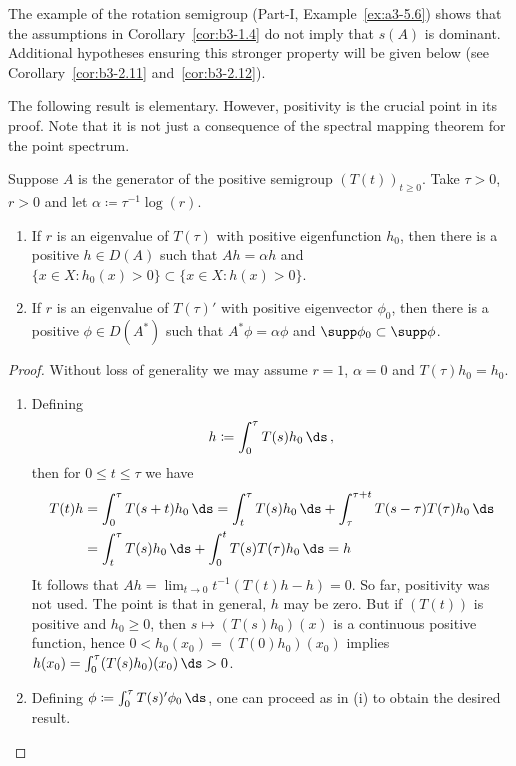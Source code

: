 The example of the rotation semigroup (Part-I, Example~\ref{ex:a3-5.6}) shows that the assumptions in Corollary~\ref{cor:b3-1.4} do not imply that $s(A)$ is dominant.
Additional hypotheses ensuring this stronger property will be given below (see Corollary~\ref{cor:b3-2.11} and~\ref{cor:b3-2.12}).

The following result is elementary. 
However, positivity is the crucial point in its proof. 	
Note that it is not just a consequence of the spectral mapping theorem for the point spectrum.
\begin{proposition}\label{prop:b3-1.5}
Suppose $A$ is the generator of the positive semigroup $(T(t))_{t \geq 0}$.
Take $\tau > 0$, $r > 0$ and let $\alpha \coloneqq \tau^{-1}\log(r)$.
\begin{enumerate}[\upshape (i)]
\item 
If\/ $r$ is an eigenvalue of\/ $T(\tau)$ with positive eigenfunction
$h_{0}$, then there is a positive $h \in D(A)$ such that $Ah = \alpha h$ and $\{x \in X \colon h_{0}(x) > 0\} \subset \{x \in X \colon h(x) > 0\}$.
		
\item 
If\/ $r$ is an eigenvalue of\/ $T(\tau)'$ with positive eigenvector $\phi_{0}$, then there is a positive $\phi \in D(A^*)$ such that $A^*\phi = \alpha\phi$ and $\supp\phi_{0} \subset \supp\phi$.
	\end{enumerate}
\end{proposition}
\begin{proof}
	Without loss of generality we may assume $r = 1$, \ie $\alpha = 0$ and $T(\tau)h_{0} = h_{0}$.
	\begin{enumerate}[\upshape (i), wide, labelindent=.25em]
    \item 
	Defining
	\begin{equation}\label{eq:b3-1.14}
		h \coloneqq \int_{0}^{\tau} T(s)h_{0} \, \ds \,,
	\end{equation}
	then for $0 \leq t \leq \tau$ we have
	\begin{align*}
		T(t)h &= \int_{0}^{\tau} T(s+t)h_{0} \, \ds  = \int_{t}^{\tau} T(s)h_{0} \, \ds  + \int_{\tau}^{\tau+t} T(s-\tau)T(\tau)h_{0} \, \ds  \\
		&= \int_{t}^{\tau} T(s)h_{0} \, \ds  + \int_{0}^{t} T(s)T(\tau)h_{0} \, \ds  = h
	\end{align*}
	It follows that $Ah = \lim_{t \to 0} t^{-1}(T(t)h - h) = 0$.
	So far, positivity was not used. 
    The point is that in general, $h$ may be zero.
	But if\/ $(T(t))$ is positive and $h_{0} \geq 0$, then $s \mapsto (T(s)h_{0})(x)$ is a continuous positive function, hence $0 < h_{0}(x_{0}) = (T(0)h_{0})(x_{0})$ implies $h(x_{0}) = \int_{0}^{\tau} (T(s)h_{0})(x_{0}) \, \ds  > 0$.
	
	\item 
	Defining $\phi \coloneqq \int_{0}^{\tau} T(s)'\phi_{0} \, \ds $, one can proceed as in (i) to obtain the desired result.
	\end{enumerate}
\end{proof}
